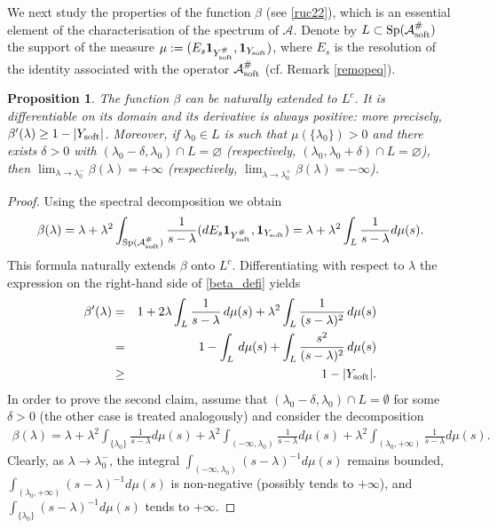 \documentclass[11pt]{article}
\newcommand\soft{{\rm soft}}
\def\AA{\mathcal{A}}
\def\l{\lambda}
\DeclareMathOperator{\Sp}{Sp}
\newtheorem{proposition}[theorem]{Proposition}
\theoremstyle{remark}
\begin{document}
We next study the properties of the function $\beta$ (see \eqref{ruc22}), which is an essential element of the characterisation of the spectrum of $\AA$. Denote by $L \subset \Sp (\AA_\soft^\# )$ the support of the measure $\mu:=(E_s\mathbf{1}_{Y_\soft^\# },\mathbf{1}_{Y_\soft })$,  where $E_s$ is the resolution of the identity associated with the operator $\AA_\soft^\# $ (cf. Remark \ref{remopeq}).
\begin{proposition}\label{p:5.7}
The function $\beta$ can be naturally extended to $L^c$. It is differentiable on its domain and its derivative is always positive: more precisely,  $\beta'(\lambda) \geq 1-|Y_\soft |$.  Moreover, if $\l_0 \in  L$ is such that $\mu(\{\l_0\})>0$ and there exists $\delta>0$ with  $(\l_0 -\delta,\l_0) \cap L = \varnothing$ (respectively, $(\l_0,\l_0 +\delta) \cap L = \varnothing$),  then  $\lim_{\l \to \l_0^-}\beta(\lambda)=+\infty$ (respectively, $\lim_{\l \to \l_0^+} \beta(\l)=-\infty$).
\end{proposition} 	
\begin{proof}
Using the spectral decomposition we obtain
\begin{equation}\label{beta_defi}
\beta(\l)=\l +\l^2 \int_{\Sp (\AA_\soft^\# )} \frac{1}{s-\l}(dE_s\mathbf{1}_{Y_\soft^\# }, \mathbf{1}_{Y_\soft })=\l +\l^2 \int_{L} \frac{1}{s-\l}d\mu(s). 	
\end{equation} 		
This formula naturally extends $\beta$ onto $L^c$.
 Differentiating with respect to $\l$ the expression on the right-hand side of \eqref{beta_defi} yields
\begin{eqnarray*}
\beta'(\lambda) &=& 1+2\l \int_{L} \frac{1}{s-\l}\,d\mu(s)+\l^2 \int
_{L} \frac{1}{(s-\l)^2}\,d\mu(s)\\ &=& 1-\int_{L} \,d\mu(s)+\int_{L}\frac{s^2}{(s-\l)^2}\, d\mu(s)\\ &\geq& 1-|Y_\soft |.
\end{eqnarray*} 	
In order to prove the second claim, assume that $(\l_0-\delta,\l_0) \cap L = \emptyset$ for some $\delta >0$ (the other case is treated analogously) and consider the  decomposition
\begin{eqnarray*}
\beta(\l)=\l +\l^2 \int_{\{\l_0\}} \frac{1}{s-\l}d\mu(s)+\l^2 \int_{(-\infty,\l_0)} \frac{1}{s-\l}d\mu(s)+\l^2 \int_{(\l_0,+\infty)} \frac{1}{s-\l}d\mu(s).
\end{eqnarray*}
Clearly,  as $\l \to \l_0^-$, the integral
$
 \int_{(-\infty,\l_0)} (s-\l)^{-1}d\mu(s)
$
 remains bounded,
$
	\int_{(\l_0,+\infty)} (s-\l)^{-1}d\mu(s)
$
 is non-negative (possibly tends to $+\infty$), and
$
	\int_{\{\l_0\}} (s-\l)^{-1}d\mu(s)
$
tends to $+\infty$.
\end{proof} 	
\end{document}
